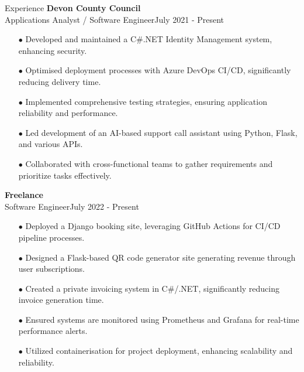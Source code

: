 \begin{rSection}{Experience}
{\bf Devon County Council} \\ 
{Applications Analyst / Software Engineer}\hfill {July 2021 - Present}
\begin{itemize}[label=\myfancylabel, leftmargin=0.5cm]
\setlength\itemsep{-0.25cm}
    \item[$\bullet$] Developed and maintained a C\#.NET Identity Management system, enhancing security.
    \item[$\bullet$] Optimised deployment processes with Azure DevOps CI/CD, significantly reducing delivery time.
    \item[$\bullet$] Implemented comprehensive testing strategies, ensuring application reliability and performance.
    \item[$\bullet$] Led development of an AI-based support call assistant using Python, Flask, and various APIs.
    \item[$\bullet$] Collaborated with cross-functional teams to gather requirements and prioritize tasks effectively.
\end{itemize}
{\bf Freelance} \\ 
{Software Engineer}\hfill {July 2022 - Present}
\begin{itemize}[label=\myfancylabel, leftmargin=0.5cm]
\setlength\itemsep{-0.25cm}
    \item[$\bullet$] Deployed a Django booking site, leveraging GitHub Actions for CI/CD pipeline processes.
    \item[$\bullet$] Designed a Flask-based QR code generator site generating revenue through user subscriptions.
    \item[$\bullet$] Created a private invoicing system in C\#/.NET, significantly reducing invoice generation time.
    \item[$\bullet$] Ensured systems are monitored using Prometheus and Grafana for real-time performance alerts.
    \item[$\bullet$] Utilized containerisation for project deployment, enhancing scalability and reliability.
\end{itemize}
\end{rSection}